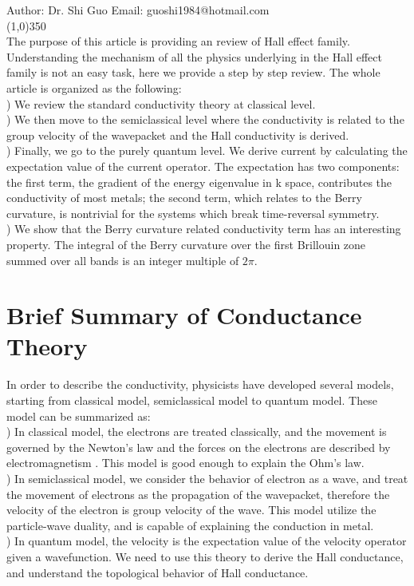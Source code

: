 \documentclass[a4paper]{article}
\begin{document}
Author: Dr. Shi Guo  \hspace{30mm} Email: guoshi1984@hotmail.com\\
\line(1,0){350}\\
\noindent The purpose of this article is providing an review of Hall effect family. Understanding the mechanism of all the physics underlying in the Hall effect family is not an easy task, here we provide a step by step review. The whole article is organized as the following:\\
) We review the standard conductivity theory at classical level.\\
) We then move to the semiclassical level where the conductivity is related to the group velocity of the wavepacket and the Hall conductivity is derived. \\
) Finally, we go to the purely quantum level. We derive current by calculating the expectation value of  the current operator. The expectation has two components: the first term, the gradient of the energy eigenvalue in k space, contributes the conductivity of most metals; the second term, which relates to the Berry curvature, is nontrivial for the systems which break time-reversal symmetry.\\
) We show that the Berry curvature related conductivity term has an interesting property. The integral of the Berry curvature over the first Brillouin zone summed over all bands is an integer multiple of $2\pi$.\\

\section{Brief Summary of Conductance Theory}
\noindent In order to describe the conductivity, physicists have developed several models, starting from classical model, semiclassical model to quantum model. These model can be summarized as:\\
) In classical model, the electrons are treated classically, and the movement is governed by the Newton's law and the forces on the electrons are described by electromagnetism . This model is good enough to explain the Ohm's law.\\
) In semiclassical model, we consider the behavior of electron as a wave, and treat the movement of electrons as the propagation of the wavepacket, therefore the velocity of the electron is group velocity of the wave. This model utilize the particle-wave duality, and is capable of explaining the conduction in metal.\\
) In quantum model, the velocity is the expectation value of the velocity operator given a wavefunction. We need to use this theory to derive the Hall conductance, and understand the topological behavior of Hall conductance.\\
\end{document}

